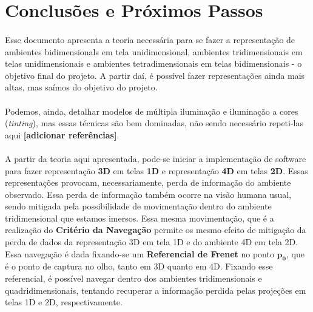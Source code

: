 \documentclass{article}
\begin{document}
	\section{Conclusões e Próximos Passos}
	
	\paragraph{}
	Esse documento apresenta a teoria necessária para se fazer a representação de ambientes bidimensionals em tela unidimensional, ambientes tridimensionais em telas unidimensionais e ambientes tetradimensionais em telas bidimensionais - o objetivo final do projeto. A partir daí, é possível fazer representações ainda mais altas, mas saímos do objetivo do projeto.
	
	\paragraph{}
	Podemos, ainda, detalhar modelos de múltipla iluminação e iluminação a cores (\textit{tinting}), mas essas técnicas são bem dominadas, não sendo necessário repeti-las aqui \textbf{[adicionar referências]}.
	
	\paragraph{}
	A partir da teoria aqui apresentada, pode-se iniciar a implementação de software para fazer representação \textbf{3D} em telas \textbf{1D} e representação \textbf{4D} em telas \textbf{2D}. Essas representações provocam, necessariamente, perda de informação do ambiente observado. Essa perda de informação também ocorre na visão humana usual, sendo mitigada pela possibilidade de movimentação dentro do ambiente tridimensional que estamos imersos. Essa mesma movimentação, que é a realização do \textbf{Critério da Navegação} permite os mesmo efeito de mitigação da perda de dados da representação 3D em tela 1D e do ambiente 4D em tela 2D. Essa navegação é dada fixando-se um \textbf{Referencial de Frenet} no ponto $\boldsymbol{p_0}$, que é o ponto de captura no olho, tanto em 3D quanto em 4D. Fixando esse referencial, é possível navegar dentro dos ambientes tridimensionais e quadridimensionais, tentando recuperar a informação perdida pelas projeções em telas 1D e 2D, respectivamente.

	
\end{document}

